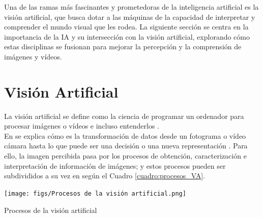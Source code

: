 Una de las ramas más fascinantes y prometedoras de la inteligencia artificial es la visión artificial, que busca dotar a las máquinas de la capacidad de interpretar y comprender el mundo visual que les rodea. La siguiente sección se centra en la importancia de la IA y su intersección con la visión artificial, explorando cómo estas disciplinas se fusionan para mejorar la percepción y la comprensión de imágenes y vídeos.

\section{Visión Artificial}
\label{sec:VA} 

La visión artificial se define como la ciencia de programar un ordenador para procesar imágenes o vídeos e incluso entenderlos \cite{Culjak12}.\\

En \cite{Bradski08} se explica cómo es la transformación de datos desde un fotograma o vídeo cámara hasta lo que puede ser una decisión o una nueva representación \cite{Alvear17}. Para ello, la imagen percibida pasa por los procesos de obtención, caracterización e interpretación de información de imágenes; y estos procesos pueden ser subdivididos a su vez en \cite{Santillan15} según el Cuadro \ref{cuadro:procesos_VA}.\\

\begin{table} [H]
  \begin{center}
      \texttt{[image: figs/Procesos de la visión artificial.png]}
  \end{center}
  \caption{Procesos de la visión artificial}
  \label{cuadro:procesos_VA}
\end{table}

